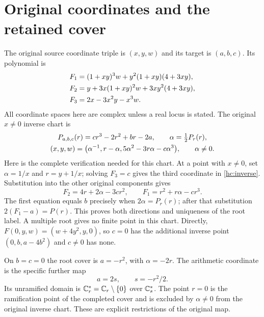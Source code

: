 \section{Original coordinates and the retained cover}
The original source coordinate triple is $(x,y,w)$ and its target is
$(a,b,c)$. Its polynomial is
\begin{align}
F_1&=(1+xy)^3w+y^2(1+xy)(4+3xy),\notag\\
F_2&=y+3x(1+xy)^2w+3xy^2(4+3xy),\notag\\
F_3&=2x-3x^2y-x^3w. \label{hc:F}
\end{align}
All coordinate spaces here are complex unless a real locus is stated.
The original $x\ne0$ inverse chart is
\begin{gather}
P_{a,b,c}(r)=cr^3-2r^2+br-2a,\qquad
\alpha=\tfrac12P_r(r),\notag\\
(x,y,w)=\bigl(\alpha^{-1},r-\alpha,
                  5\alpha^2-3r\alpha-c\alpha^3\bigr),\qquad \alpha\ne0.
\label{hc:inverse}
\end{gather}
Here is the complete verification needed for this chart. At a point
with $x\ne0$, set $\alpha=1/x$ and $r=y+1/x$; solving $F_3=c$
gives the third coordinate in \eqref{hc:inverse}. Substitution into
the other original components gives
\[
F_2=4r+2\alpha-3cr^2,\qquad F_1=r^2+r\alpha-cr^3.
\]
The first equation equals $b$ precisely when $2\alpha=P_r(r)$;
after that substitution $2(F_1-a)=P(r)$. This proves both directions
and uniqueness of the root label. A multiple root gives no finite
point in this chart. Directly, $F(0,y,w)=(w+4y^2,y,0)$, so $c=0$
has the additional inverse point $(0,b,a-4b^2)$ and $c\ne0$ has none.

On $b=c=0$ the root cover is $a=-r^2$, with $\alpha=-2r$.
The arithmetic coordinate is the specific further map
\begin{equation}
a=2s,\qquad s=-r^2/2. \label{hc:cover}
\end{equation}
Its unramified domain is $\mathbb C_r^*=\mathbb C_r\setminus\{0\}$ over
$\mathbb C_s^*$. The point $r=0$ is the ramification point of the completed
cover and is excluded by $\alpha\ne0$ from the original inverse chart.
These are explicit restrictions of the original map.

